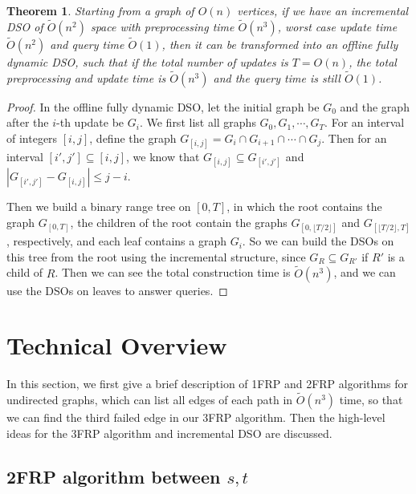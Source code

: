 \documentclass[11pt]{article}
\theoremstyle{plain}
\newtheorem{theorem}{Theorem}[section]
\theoremstyle{definition}
\begin{document}
\begin{theorem}\label{thm:offline}
    Starting from a graph of $O(n)$ vertices, if we have an incremental DSO of $\tilde{O}(n^2)$ space with preprocessing time $\tilde{O}(n^3)$, worst case update time $\tilde{O}(n^2)$ and query time $\tilde{O}(1)$, then it can be transformed into an offline fully dynamic DSO, such that if the total number of updates is $T=O(n)$, the total preprocessing and update time is $\tilde{O}(n^3)$ and the query time is still $\tilde{O}(1)$.
\end{theorem}
\begin{proof}
    In the offline fully dynamic DSO, let the initial graph be $G_0$ and the graph after the $i$-th update be $G_i$. We first list all graphs $G_0,G_1,\cdots,G_T$. For an interval of integers $[i,j]$, define the graph $G_{[i,j]}=G_i\cap G_{i+1}\cap\cdots\cap G_j$. Then for an interval $[i',j']\subseteq [i,j]$, we know that $G_{[i,j]}\subseteq G_{[i',j']}$ and $|G_{[i',j']}-G_{[i,j]}|\leq j-i$.

    Then we build a binary range tree on $[0,T]$, in which the root contains the graph $G_{[0,T]}$, the children of the root contain the graphs $G_{[0,\lfloor T/2\rfloor]}$ and $G_{[\lfloor T/2\rfloor,T]}$, respectively, and each leaf contains a graph $G_i$. So we can build the DSOs on this tree from the root using the incremental structure, since $G_R\subseteq G_{R'}$ if $R'$ is a child of $R$. Then we can see the total construction time is $\tilde{O}(n^3)$, and we can use the DSOs on leaves to answer queries.
\end{proof}










 \section{Technical Overview}\label{sec:overview}

In this section, we first give a brief description of 1FRP and 2FRP algorithms for undirected graphs, which can list all edges of each path in $\tilde{O}(n^3)$ time, so that we can find the third failed edge in our 3FRP algorithm. Then the high-level ideas for the 3FRP algorithm and incremental DSO are discussed. 

\subsection{2FRP algorithm between $s,t$}\label{sec:2FRP}
\end{document}

